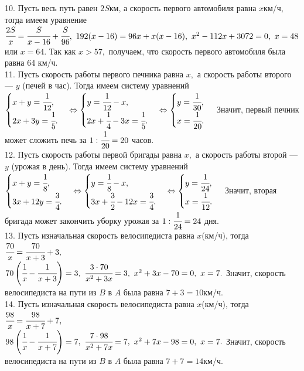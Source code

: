 10. Пусть весь путь равен $2S$км, а скорость первого автомобиля равна $x$км/ч, тогда имеем уравнение $\cfrac{2S}{x}=\cfrac{S}{x-16}+\cfrac{S}{96},\
192(x-16)=96x+x(x-16),\ x^2-112x+3072=0,\ x=48$ или $x=64.$ Так как $x>57,$ получаем, что скорость первого автомобиля была равна 64 км/ч.\\
11. Пусть скорость работы первого печника равна $x,$ а скорость работы второго --- $y$ (печей в час). Тогда имеем систему уравнений
$\begin{cases} x+y=\cfrac{1}{12},\\ 2x+3y=\cfrac{1}{5}.\end{cases}
\Leftrightarrow \begin{cases} y=\cfrac{1}{12}-x,\\ 2x+\cfrac{1}{4}-3x=\cfrac{1}{5}.\end{cases}
\Leftrightarrow \begin{cases} y=\cfrac{1}{30},\\ x=\cfrac{1}{20}.\end{cases}$
Значит, первый печник может сложить печь за $1:\cfrac{1}{20}=20$ часов.\\
12. Пусть скорость работы первой бригады равна $x,$ а скорость работы второй --- $y$ (урожая в день). Тогда имеем систему уравнений
$\begin{cases} x+y=\cfrac{1}{8},\\ 3x+12y=\cfrac{3}{4}.\end{cases}
\Leftrightarrow \begin{cases} y=\cfrac{1}{8}-x,\\ 3x+\cfrac{3}{2}-12x=\cfrac{3}{4}.\end{cases}
\Leftrightarrow \begin{cases} y=\cfrac{1}{24},\\ x=\cfrac{1}{12}.\end{cases}$
Значит, вторая бригада может закончить уборку урожая за $1:\cfrac{1}{24}=24$ дня.\\
13. Пусть изначальная скорость велосипедиста равна $x$(км/ч), тогда $\cfrac{70}{x}=\cfrac{70}{x+3}+3,$\\$
70\left(\cfrac{1}{x}-\cfrac{1}{x+3}\right)=3,\ \cfrac{3\cdot70}{x^2+3x}=3,\ x^2+3x-70=0,\ x=7.$ Значит, скорость велосипедиста на пути из $B$ в $A$ была равна $7+3=10$км/ч.\\
14. Пусть изначальная скорость велосипедиста равна $x$(км/ч), тогда $\cfrac{98}{x}=\cfrac{98}{x+7}+7,$\\$
98\left(\cfrac{1}{x}-\cfrac{1}{x+7}\right)=7,\ \cfrac{7\cdot98}{x^2+7x}=7,\ x^2+7x-98=0,\ x=7.$ Значит, скорость велосипедиста на пути из $B$ в $A$ была равна $7+7=14$км/ч.\\
